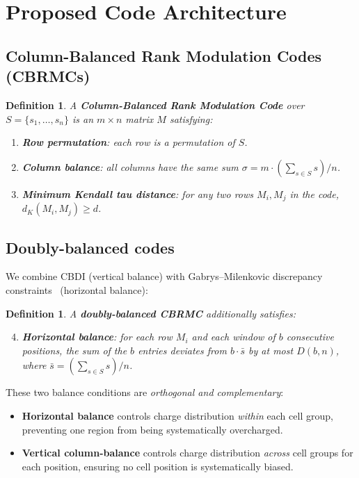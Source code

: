 \documentclass[11pt]{article}
\newtheorem{definition}[theorem]{Definition}
\begin{document}
\section{Proposed Code Architecture}
\label{sec:architecture}

\subsection{Column-Balanced Rank Modulation Codes (CBRMCs)}

\begin{definition}
A \textbf{Column-Balanced Rank Modulation Code} over $S = \{s_1, \dots, s_n\}$ is an $m \times n$ matrix $M$ satisfying:
\begin{enumerate}
\item \textbf{Row permutation}: each row is a permutation of $S$.
\item \textbf{Column balance}: all columns have the same sum $\sigma = m \cdot (\sum_{s \in S} s)/n$.
\item \textbf{Minimum Kendall tau distance}: for any two rows $M_i, M_j$ in the code, $d_K(M_i, M_j) \geq d$.
\end{enumerate}
\end{definition}

\subsection{Doubly-balanced codes}

We combine CBDI (vertical balance) with Gabrys--Milenkovic discrepancy constraints~\cite{gabrys2016} (horizontal balance):

\begin{definition}
A \textbf{doubly-balanced CBRMC} additionally satisfies:
\begin{enumerate}
\setcounter{enumi}{3}
\item \textbf{Horizontal balance}: for each row $M_i$ and each window of $b$ consecutive positions, the sum of the $b$ entries deviates from $b \cdot \bar{s}$ by at most $D(b,n)$, where $\bar{s} = (\sum_{s \in S} s)/n$.
\end{enumerate}
\end{definition}

These two balance conditions are \emph{orthogonal and complementary}:
\begin{itemize}
\item \textbf{Horizontal balance} controls charge distribution \emph{within} each cell group, preventing one region from being systematically overcharged.
\item \textbf{Vertical column-balance} controls charge distribution \emph{across} cell groups for each position, ensuring no cell position is systematically biased.
\end{itemize}
\end{document}
